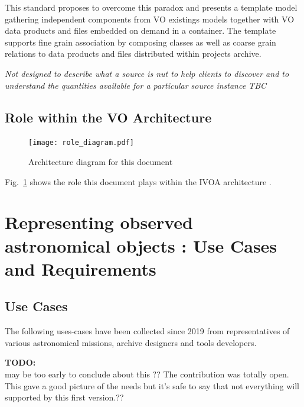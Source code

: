 \documentclass[11pt,a4paper]{ivoa}
\newcommand{\TODO}[1]{%
    \noindent%
    \colorbox{todocolor}{%
            \parbox{0.85\linewidth}{\sffamily \textbf{TODO:}\\
            #1}
    }%
    \vspace{2pt}

}
\begin{document}
This standard proposes to overcome this paradox and presents a template model gathering independent components from VO existings models together with VO data products and files embedded on demand in a container.
The template supports fine grain association by composing classes as well as coarse grain relations to data products and files distributed within projects archive.

\emph{Not designed to describe what a source is nut to help clients to discover and to understand the quantities available for a particular source instance TBC}

\subsection{Role within the VO Architecture}

\begin{figure}
\centering


\texttt{[image: role\_diagram.pdf]}
\caption{Architecture diagram for this document}
\label{fig:archdiag}
\end{figure}

Fig.~\ref{fig:archdiag} shows the role this document plays within the
IVOA architecture \citep{note:VOARCH}.



\section{Representing observed astronomical objects : Use Cases and  Requirements}

\subsection{Use Cases}
The following uses-cases have been collected since 2019 from representatives of various astronomical missions, archive designers and tools developers.

\TODO{ may be too early to conclude about this ?? The contribution was totally open. This gave a good picture of the needs but it's safe to say that not everything will supported by this first version.??}
\end{document}
